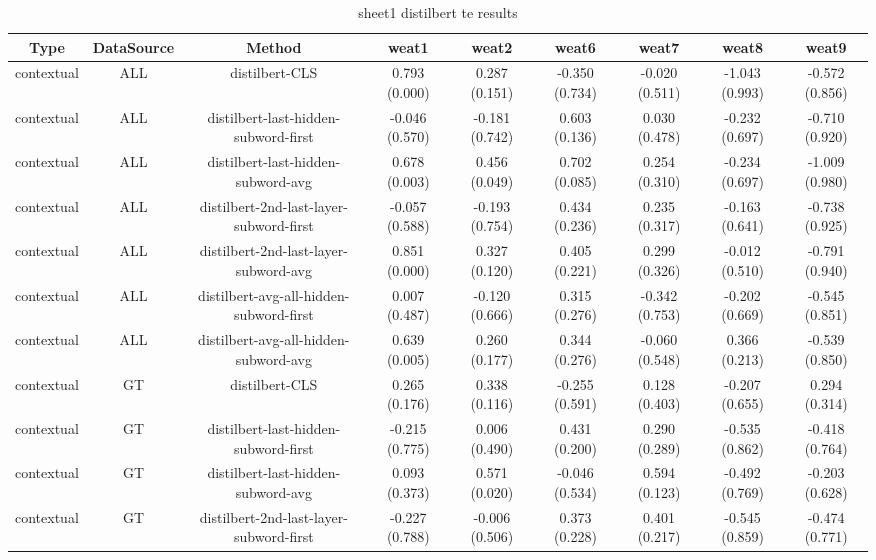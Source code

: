 \begin{sidewaystable}[htb]
    \centering
    \caption{sheet1 distilbert te results}
    \label{appendix_tab:sheet1_distilbert_te_results}
    \small
    \begin{tabular}{@{}ccccccccc@{}}
        \toprule
        Type & DataSource & Method & weat1 & weat2 & weat6 & weat7 & weat8 & weat9 \\
        \midrule
        contextual & ALL & distilbert-CLS & 0.793 (0.000) & 0.287 (0.151) & -0.350 (0.734) & -0.020 (0.511) & -1.043 (0.993) & -0.572 (0.856) \\
        contextual & ALL & distilbert-last-hidden-subword-first & -0.046 (0.570) & -0.181 (0.742) & 0.603 (0.136) & 0.030 (0.478) & -0.232 (0.697) & -0.710 (0.920) \\
        contextual & ALL & distilbert-last-hidden-subword-avg & 0.678 (0.003) & 0.456 (0.049) & 0.702 (0.085) & 0.254 (0.310) & -0.234 (0.697) & -1.009 (0.980) \\
        contextual & ALL & distilbert-2nd-last-layer-subword-first & -0.057 (0.588) & -0.193 (0.754) & 0.434 (0.236) & 0.235 (0.317) & -0.163 (0.641) & -0.738 (0.925) \\
        contextual & ALL & distilbert-2nd-last-layer-subword-avg & 0.851 (0.000) & 0.327 (0.120) & 0.405 (0.221) & 0.299 (0.326) & -0.012 (0.510) & -0.791 (0.940) \\
        contextual & ALL & distilbert-avg-all-hidden-subword-first & 0.007 (0.487) & -0.120 (0.666) & 0.315 (0.276) & -0.342 (0.753) & -0.202 (0.669) & -0.545 (0.851) \\
        contextual & ALL & distilbert-avg-all-hidden-subword-avg & 0.639 (0.005) & 0.260 (0.177) & 0.344 (0.276) & -0.060 (0.548) & 0.366 (0.213) & -0.539 (0.850) \\
        contextual & GT & distilbert-CLS & 0.265 (0.176) & 0.338 (0.116) & -0.255 (0.591) & 0.128 (0.403) & -0.207 (0.655) & 0.294 (0.314) \\
        contextual & GT & distilbert-last-hidden-subword-first & -0.215 (0.775) & 0.006 (0.490) & 0.431 (0.200) & 0.290 (0.289) & -0.535 (0.862) & -0.418 (0.764) \\
        contextual & GT & distilbert-last-hidden-subword-avg & 0.093 (0.373) & 0.571 (0.020) & -0.046 (0.534) & 0.594 (0.123) & -0.492 (0.769) & -0.203 (0.628) \\
        contextual & GT & distilbert-2nd-last-layer-subword-first & -0.227 (0.788) & -0.006 (0.506) & 0.373 (0.228) & 0.401 (0.217) & -0.545 (0.859) & -0.474 (0.771) \\

\end{tabular}
\end{sidewaystable}
